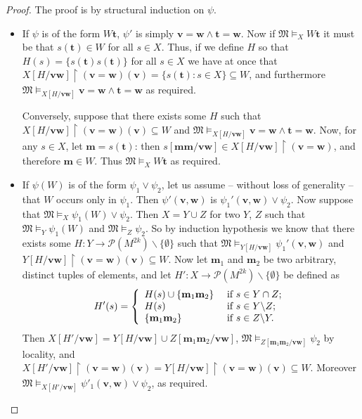 \documentclass{article}
\theoremstyle{definition}
\newcommand{\tuple}{\mathbf}
\newcommand{\M}{\mathfrak M}
\newcommand{\parts}{\mathcal P}
\begin{document}
\begin{proof}
	The proof is by structural induction on $\psi$. 
	\begin{itemize}
		\item If $\psi$ is of the form $W \tuple t$, $\psi'$ is simply $\tuple v = \tuple w \wedge \tuple t = \tuple w$. Now if $\M \models_X W \tuple t$ it must be that $s(\tuple t) \in W$ for all $s \in X$. Thus, if we define $H$ so that $H(s) = \{s(\tuple t) s(\tuple t)\}$ for all $s \in X$ we have at once that $X[H/\tuple v \tuple w]\upharpoonright (\tuple v = \tuple w) (\tuple v) = \{s(\tuple t): s \in X\} \subseteq W$, and furthermore $\M \models_{X[H/\tuple v \tuple w]} \tuple v = \tuple w \wedge \tuple t = \tuple w$ as required.

			Conversely, suppose that there exists some $H$ such that $X[H/\tuple v \tuple w]\upharpoonright (\tuple v = \tuple w)(\tuple v) \subseteq W$ and $\M \models_{X[H/\tuple v \tuple w]} \tuple v = \tuple w \wedge \tuple t = \tuple w$. Now, for any $s \in X$, let $\tuple m = s(\tuple t)$: then $s[\tuple m \tuple m/\tuple v \tuple w] \in X[H/\tuple v \tuple w]\upharpoonright (\tuple v = \tuple w)$, and therefore $\tuple m \in W$.  %
Thus $\M \models_X W \tuple t$ as required. 
		\item If $\psi(W)$ is of the form $\psi_1 \vee \psi_2$, let us assume -- without loss of generality -- that $W$ occurs only in $\psi_1$. Then $\psi'(\tuple v, \tuple w)$ is $\psi_1'(\tuple v, \tuple w) \vee \psi_2$. Now suppose that $\M \models_X \psi_1(W) \vee \psi_2$. Then $X = Y \cup Z$ for two $Y$, $Z$ such that $\M \models_Y \psi_1(W)$ and $\M \models_Z \psi_2$. So by induction hypothesis we know that there exists some $H: Y \rightarrow \parts(M^{2k}) \backslash \{\emptyset\}$ such that $\M \models_{Y[H/\tuple v \tuple w]} \psi_1'(\tuple v, \tuple w)$ and $Y[H/\tuple v \tuple w]\upharpoonright (\tuple v = \tuple w)(\tuple v) \subseteq W$. Now let $\tuple m_1$ and $\tuple m_2$ be two arbitrary, distinct tuples of elements, and let $H': X \rightarrow \parts(M^{2k})\backslash \{\emptyset\}$ be defined as 
			\[
				H'(s) = \left\{\begin{array}{l l}
					H(s) \cup \{\tuple m_1 \tuple m_2\} & \text{ if } s \in Y \cap Z;\\
					H(s) & \text{ if } s \in Y \backslash Z;\\
					\{\tuple m_1 \tuple m_2\} & \text{ if } s \in Z \backslash Y.
				\end{array}
					\right.
			\]
			Then $X[H'/\tuple v \tuple w] = Y[H/\tuple v \tuple w] \cup Z[\tuple m_1 \tuple m_2 / \tuple v \tuple w]$, $\M \models_{Z[\tuple m_1 \tuple m_2/\tuple v \tuple w]} \psi_2$ by locality, and $X[H'/\tuple v \tuple w]\upharpoonright (\tuple v = \tuple w)(\tuple v)  = Y[H/\tuple v \tuple w]\upharpoonright (\tuple v = \tuple w)(\tuple v) \subseteq W$. Moreover $\M \models_{X[H'/\tuple v \tuple w]} \psi'_1(\tuple v, \tuple w) \vee \psi_2$, as required. 


\end{itemize}
\end{proof}
\end{document}
